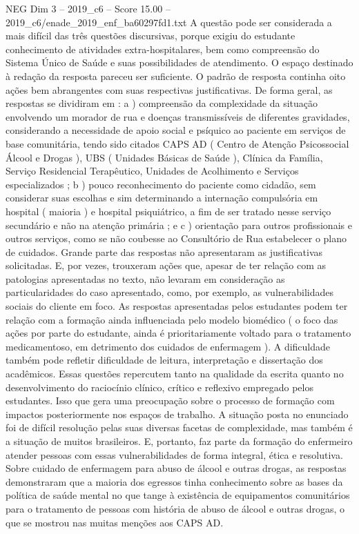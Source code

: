 \begin{textsample}{NEG Dim 3 – 2019\_c6 – Score 15.00 – 2019\_c6/enade\_2019\_enf\_ba60297fd1.txt}
A questão pode ser considerada a mais difícil das três questões discursivas, porque exigiu do estudante conhecimento de atividades extra-hospitalares, bem como compreensão do Sistema Único de Saúde e suas possibilidades de atendimento.
O espaço destinado à redação da resposta pareceu ser suficiente.
O padrão de resposta continha oito ações bem abrangentes com suas respectivas justificativas.
De forma geral, as respostas se dividiram em : a ) compreensão da complexidade da situação envolvendo um morador de rua e doenças transmissíveis de diferentes gravidades, considerando a necessidade de apoio social e psíquico ao paciente em serviços de base comunitária, tendo sido citados CAPS AD ( Centro de Atenção Psicossocial Álcool e Drogas ), UBS ( Unidades Básicas de Saúde ), Clínica da Família, Serviço Residencial Terapêutico, Unidades de Acolhimento e Serviços especializados ; b ) pouco reconhecimento do paciente como cidadão, sem considerar suas escolhas e sim determinando a internação compulsória em hospital ( maioria ) e hospital psiquiátrico, a fim de ser tratado nesse serviço secundário e não na atenção primária ; e c ) orientação para outros profissionais e outros serviços, como se não coubesse ao Consultório de Rua estabelecer o plano de cuidados.
Grande parte das respostas não apresentaram as justificativas solicitadas.
E, por vezes, trouxeram ações que, apesar de ter relação com as patologias apresentadas no texto, não levaram em consideração as particularidades do caso apresentado, como, por exemplo, as vulnerabilidades sociais do cliente em foco.
As respostas apresentadas pelos estudantes podem ter relação com a formação ainda influenciada pelo modelo biomédico ( o foco das ações por parte do estudante, ainda é prioritariamente voltado para o tratamento medicamentoso, em detrimento dos cuidados de enfermagem ).
A dificuldade também pode refletir dificuldade de leitura, interpretação e dissertação dos acadêmicos.
Essas questões repercutem tanto na qualidade da escrita quanto no desenvolvimento do raciocínio clínico, crítico e reflexivo empregado pelos estudantes.
Isso que gera uma preocupação sobre o processo de formação com impactos posteriormente nos espaços de trabalho.
A situação posta no enunciado foi de difícil resolução pelas suas diversas facetas de complexidade, mas também é a situação de muitos brasileiros.
E, portanto, faz parte da formação do enfermeiro atender pessoas com essas vulnerabilidades de forma integral, ética e resolutiva.
Sobre cuidado de enfermagem para abuso de álcool e outras drogas, as respostas demonstraram que a maioria dos egressos tinha conhecimento sobre as bases da política de saúde mental no que tange à existência de equipamentos comunitários para o tratamento de pessoas com história de abuso de álcool e outras drogas, o que se mostrou nas muitas menções aos CAPS AD.

\end{textsample}
